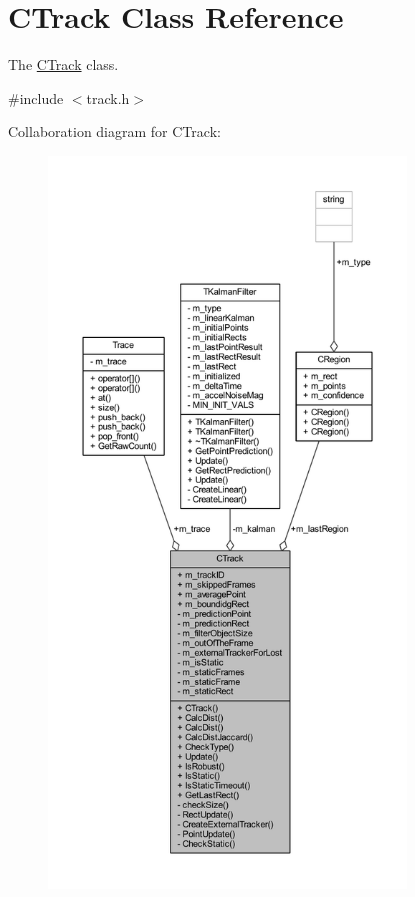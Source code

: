 \hypertarget{class_c_track}{}\section{C\+Track Class Reference}
\label{class_c_track}


The \mbox{\hyperlink{class_c_track}{C\+Track}} class.  




{\ttfamily \#include $<$track.\+h$>$}



Collaboration diagram for C\+Track\+:\nopagebreak
\begin{figure}[H]
\begin{center}
\leavevmode
\includegraphics[height=550pt]{class_c_track__coll__graph}
\end{center}
\end{figure}
